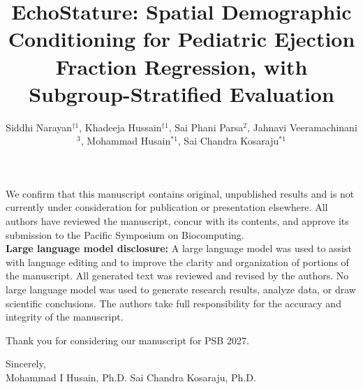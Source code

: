 \documentclass{ws-procs11x85}
\begin{document}
\vspace{0.5em}
\noindent We confirm that this manuscript contains original, unpublished results and is not currently under consideration for publication or presentation elsewhere.
All authors have reviewed the manuscript, concur with its contents, and approve its submission to the Pacific Symposium on Biocomputing.\\

\noindent \textbf{Large language model disclosure:}
A large language model was used to assist with language editing and to improve the clarity and organization of portions of the manuscript.
All generated text was reviewed and revised by the authors.
No large language model was used to generate research results, analyze data, or draw scientific conclusions.
The authors take full responsibility for the accuracy and integrity of the manuscript.

\vspace{0.5em}
\noindent Thank you for considering our manuscript for PSB 2027.

\vspace{1em}
\noindent Sincerely,\\
Mohammad I Husain, Ph.D. Sai Chandra Kosaraju, Ph.D.

\newpage
\title{EchoStature: Spatial Demographic Conditioning for Pediatric Ejection Fraction Regression, with Subgroup-Stratified Evaluation}

\author{Siddhi Narayan$^{\dagger1}$, Khadeeja Hussain$^{\dagger1}$, Sai Phani Parsa${^{2}}$, Jahnavi Veeramachinani${^{3}}$, Mohammad Husain$^{*1}$, Sai Chandra Kosaraju$^{*1}$}

\address{$^1$Department of Computer Science, California State Polytechnic University, Pomona,  California, USA}

\address{$^2$Department of Computer Science, University of Nevada Las Vegas, Las Vegas,  Nevada, USA}

\address{$^3$Department of Information Systems, University of Nevada Las Vegas, Las Vegas,  Nevada, USA}

\address{$^*$Corresponding Authors: \href{mailto:mihusain@cpp.edu}{mihusain@cpp.edu}, \href{mailto:skosaraju@cpp.edu}{skosaraju@cpp.edu}}

\end{document}
